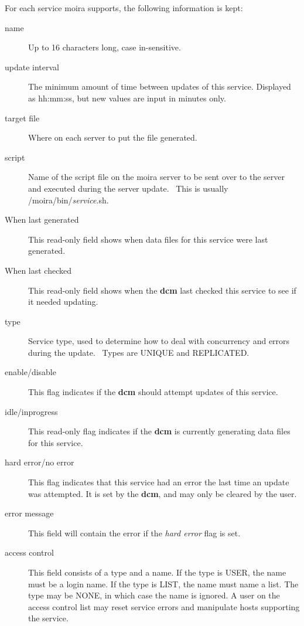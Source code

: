 For each service moira supports, the following information is kept:
\begin{description}
\item[name] Up to 16 characters long, case in-sensitive.
\item[update interval] The minimum amount of time between updates of this
service. Displayed as hh:mm:ss, but new values are input in minutes
only.
\item[target file] Where on each server to put the file generated.
\item[script] Name of the script file on the moira server to be sent over to
the server and executed during the server update.  \athena\ This is
usually /moira/bin/{\em service}.sh.
\item[When last generated] This read-only field shows when data files for
this service were last generated.
\item[When last checked] This read-only field shows when the {\bf dcm} last
checked this service to see if it needed updating.
\item[type] Service type, used to determine how to deal with concurrency and
errors during the update.  \athena\ Types are UNIQUE and REPLICATED.
\item[enable/disable] This flag indicates if the {\bf dcm} should attempt
updates of this service.
\item[idle/inprogress] This read-only flag indicates if the {\bf dcm} is
currently generating data files for this service. 
\item[hard error/no error] This flag indicates that this service had an
error the last time an update was attempted.  It is set by the
{\bf dcm}, and may only be cleared by the user.
\item[error message] This field will contain the error if the {\em hard error}
flag is set.
\item[access control] This field consists of a type and a name.  If the type
is USER, the name must be a login name.  If the type is LIST, the name
must name a list.  The type may be NONE, in which case the name is
ignored.  A user on the access control list may reset service errors
and manipulate hosts supporting the service.
\end{description}

